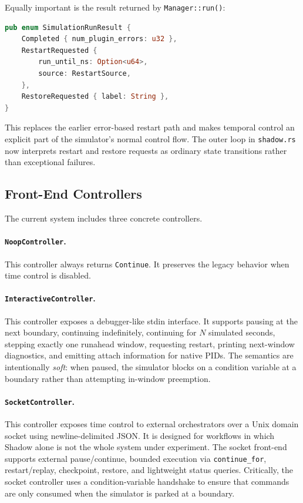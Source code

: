 \documentclass[11pt,a4paper]{article}
\begin{document}
Equally important is the result returned by \texttt{Manager::run()}:

\begin{lstlisting}[language=Rust]
pub enum SimulationRunResult {
    Completed { num_plugin_errors: u32 },
    RestartRequested {
        run_until_ns: Option<u64>,
        source: RestartSource,
    },
    RestoreRequested { label: String },
}
\end{lstlisting}

This replaces the earlier error-based restart path and makes temporal control
an explicit part of the simulator's normal control flow. The outer loop in
\texttt{shadow.rs} now interprets restart and restore requests as ordinary
state transitions rather than exceptional failures.

\subsection{Front-End Controllers}

The current system includes three concrete controllers.

\paragraph{\texttt{NoopController}.}
This controller always returns \texttt{Continue}. It preserves the legacy
behavior when time control is disabled.

\paragraph{\texttt{InteractiveController}.}
This controller exposes a debugger-like stdin interface. It supports pausing
at the next boundary, continuing indefinitely, continuing for \(N\) simulated
seconds, stepping exactly one runahead window, requesting restart, printing
next-window diagnostics, and emitting attach information for native PIDs.
The semantics are intentionally \emph{soft}: when paused, the simulator blocks
on a condition variable at a boundary rather than attempting in-window
preemption.

\paragraph{\texttt{SocketController}.}
This controller exposes time control to external orchestrators over a Unix
domain socket using newline-delimited JSON. It is designed for workflows in
which Shadow alone is not the whole system under experiment. The socket
front-end supports external pause/continue, bounded execution via
\texttt{continue\_for}, restart/replay, checkpoint, restore, and lightweight
status queries. Critically, the socket controller uses a condition-variable
handshake to ensure that commands are only consumed when the simulator is
parked at a boundary.
\end{document}
